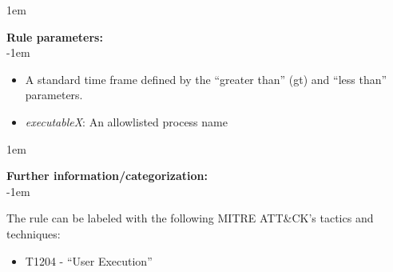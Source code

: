 \openup 1em

{\bf Rule parameters:} \\

\openup -1em
\vspace{-2em}

\begin{itemize}
	\item A standard time frame defined by the ``greater than'' (gt) and ``less than'' parameters.
	\item \emph{executableX}: An allowlisted process name
\end{itemize}

\openup 1em

{\bf Further information/categorization:} \\

\openup -1em
\vspace{-2em}


The rule can be labeled with the following MITRE ATT\&CK's tactics and techniques:
\begin{itemize}
	\item T1204 - ``User Execution''
\end{itemize}

\pagebreak

